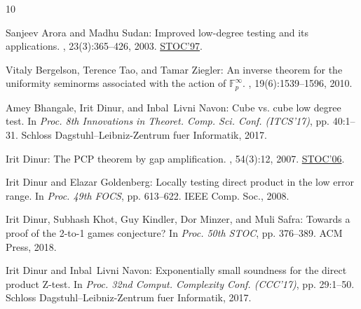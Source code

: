 \documentclass[11pt]{article}
\numberwithin{equation}{section}
\theoremstyle{definition}
\theoremstyle{plain}
\begin{document}
\tocrefpdfbookmark
\begin{thebibliography}{10}

{\sc Sanjeev Arora and Madhu Sudan}: Improved low-degree testing and its
  applications.
, 23(3):365--426, 2003.
\newblock \prelim \href{https://doi.org/10.1145/258533.258642}{STOC'97}.

{\sc Vitaly Bergelson, Terence Tao, and Tamar Ziegler}: An inverse theorem for
  the uniformity seminorms associated with the action of $\mathbb{F}^\infty_p$.
, 19(6):1539--1596, 2010.

{\sc Amey Bhangale, Irit Dinur, and Inbal~Livni Navon}: Cube vs. cube low
  degree test.
\newblock In {\em Proc. 8th Innovations in Theoret. Comp. Sci. Conf.
  (ITCS'17)}, pp. 40:1--31. Schloss Dagstuhl--Leibniz-Zentrum fuer Informatik,
  2017.

{\sc Irit Dinur}: The {PCP} theorem by gap amplification.
, 54(3):12, 2007.
\newblock \prelim \href{https://doi.org/10.1145/1132516.1132553}{STOC'06}.

{\sc Irit Dinur and Elazar Goldenberg}: Locally testing direct product in the
  low error range.
\newblock In {\em Proc. 49th FOCS}, pp. 613--622. IEEE Comp. Soc., 2008.

{\sc Irit Dinur, Subhash Khot, Guy Kindler, Dor Minzer, and Muli Safra}:
  Towards a proof of the 2-to-1 games conjecture?
\newblock In {\em Proc. 50th STOC}, pp. 376--389. ACM Press, 2018.

{\sc Irit Dinur and Inbal~Livni Navon}: Exponentially small soundness for the
  direct product {Z}-test.
\newblock In {\em Proc. 32nd Comput. Complexity Conf. (CCC'17)}, pp. 29:1--50.
  Schloss Dagstuhl--Leibniz-Zentrum fuer Informatik, 2017.


\end{thebibliography}
\end{document}
